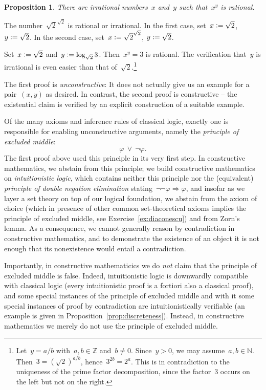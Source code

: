 \documentclass[10pt,reqno,a4paper,openany]{amsbook}
\makeatletter
\theoremstyle{definition}
\theoremstyle{plain}
\newtheorem{prop}[defn]{Proposition}
\theoremstyle{remark}
\newcommand{\ZZ}{\mathbb{Z}}
\newcommand{\NN}{\mathbb{N}}
\newcommand{\?}{\,{:}\,}
\renewcommand{\_}{\mathpunct{.}\,}
\newcommand{\defeq}{\vcentcolon=}
\renewenvironment{proof}[1][\proofname]{\par
  \pushQED{\qed}%
  \normalfont \topsep6\p@\@plus6\p@\relax
  \trivlist
  \item[\hskip\labelsep
        \itshape
    #1\@addpunct{.}]\ignorespaces
}{%
  \popQED\endtrivlist\@endpefalse
}
\makeatother
\begin{document}
\begin{prop}There are irrational numbers~$x$ and~$y$ such that~$x^y$ is
rational.
\end{prop}
\begin{proof}[First proof] The number~$\sqrt{2}^{\sqrt{2}}$ is rational or
irrational. In the first case, set~$x \defeq \sqrt{2}$, $y \defeq \sqrt{2}$.
In the second case, set~$x \defeq \sqrt{2}^{\sqrt{2}}$, $y \defeq \sqrt{2}$.
\end{proof}
\begin{proof}[Second proof] Set~$x \defeq \sqrt{2}$ and~$y \defeq \log_{\sqrt{2}} 3$.
Then~$x^y = 3$ is rational. The verification that~$y$ is irrational is even
easier than that of~$\sqrt{2}$.\footnote{Let~$y = a/b$ with~$a, b \in \ZZ$
and~$b \neq 0$. Since~$y > 0$, we may assume~$a, b \in \NN$. Then~$3 =
(\sqrt{2})^{a/b}$, hence~$3^{2b} = 2^a$. This is in contradiction to the
uniqueness of the prime factor decomposition, since the factor~$3$ occurs on
the left but not on the right.}
\end{proof}

The first proof is \emph{unconstructive}: It does not actually give us an
example for a pair~$(x,y)$ as desired. In contrast, the second proof is
constructive -- the existential claim is verified by an explicit construction
of a suitable example.

Of the many axioms and inference rules of classical logic, exactly one is
responsible for enabling unconstructive arguments, namely the \emph{principle
of excluded middle}:
\[ \varphi \ \vee\ \neg\varphi. \]
The first proof above used this principle in its very first step. In
constructive mathematics, we abstain from this principle; we build
constructive mathematics on \emph{intuitionistic logic}, which contains neither
this principle nor the (equivalent) \emph{principle of double negation
elimination} stating~$\neg\neg\varphi \Rightarrow \varphi$, and insofar as we
layer a set theory on top of our logical foundation, we abstain from the axiom
of choice (which in presence of other common set-theoretical axioms implies the
principle of excluded middle, see Exercise~\ref{ex:diaconescu}) and from Zorn's lemma. As a
consequence, we cannot generally reason by contradiction in constructive
mathematics, and to demonstrate the existence of an object
it is not enough that its nonexistence would entail a contradiction.

Importantly, in constructive mathematicics we do \emph{not} claim that the principle of
excluded middle is false. \marginpar{\dbend}
Indeed, intuitionistic logic is downwardly compatible
with classical logic (every intuitionistic proof is a fortiori also a classical
proof), and some special instances of the principle of excluded middle and with
it some special instances of proof by contradiction are
intuitionistically verifiable (an example is given in
Proposition~\ref{prop:discreteness}). Instead, in constructive mathematics we
merely do not use the principle of excluded middle.
\end{document}
